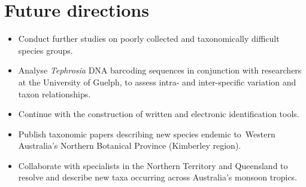 \documentclass[version=last,
    paper=a4, %
    10pt, %
    usenames,
    dvipsnames,
    oneside, %
    headings=openany, %
    DIV=15 %
]{scrbook}
\begin{document}
\section*{Future directions}
\begin{itemize}
\itemsep1pt\parskip0pt
\item
  Conduct further studies on poorly collected and taxonomically
  difficult species groups.
\item
  Analyse \emph{Tephrosia} DNA barcoding sequences in conjunction with
  researchers at the University of Guelph, to assess intra- and
  inter-specific variation and taxon relationships.
\item
  Continue with the construction of written and electronic
  identification tools.
\item
  Publish taxonomic papers describing new species endemic to~Western
  Australia's Northern Botanical Province (Kimberley region).
\item
  Collaborate with specialists in the Northern Territory and Queensland
  to resolve and describe new taxa occurring across Australia's monsoon
  tropics.
\end{itemize}



\end{document}
